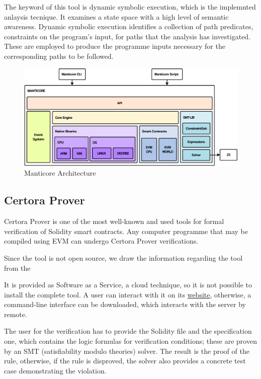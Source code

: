 The keyword of this tool is dynamic symbolic execution, which is the implemnted anlaysis tecnique. 
It examines a state space with a high level of semantic awareness.
Dynamic symbolic execution identifies a collection of path predicates, constraints on the program's input, 
for paths that the analysis has investigated.
These are employed to produce the programme inputs necessary for the corresponding paths to be followed. 



\begin{figure}
    \centering
    \includegraphics[width=13cm]{logos/ManticoreArchitecture.pdf}
    \caption{Manticore Architecture}
    \label{fig:manticore_architecture}
\end{figure}

\subsection{Certora Prover}
\label{sec:Specification:Certora}
Certora Prover is one of the most well-known and used tools for formal verification of Solidity smart contracts. 
Any computer programme that may be compiled using EVM can undergo Certora Prover verifications. 

Since the tool is not open source, we draw the information regarding the tool from the 

It is provided as Software as a Service, a cloud technique, so it is not possible to install the complete tool. A user can interact with it on its \href{https://demo.certora.com/}{website}, 
otherwise, a command-line interface can be downloaded, which interacts with the server by remote. 

The user for the verification has to provide the Solidity file and the specification one, which contains the logic formulas for verification conditions; these are proven by an SMT (satisfiability modulo theories) solver. 
The result is the proof of the rule, otherwise, if the rule is disproved, the solver also provides a concrete test case demonstrating the violation. 

